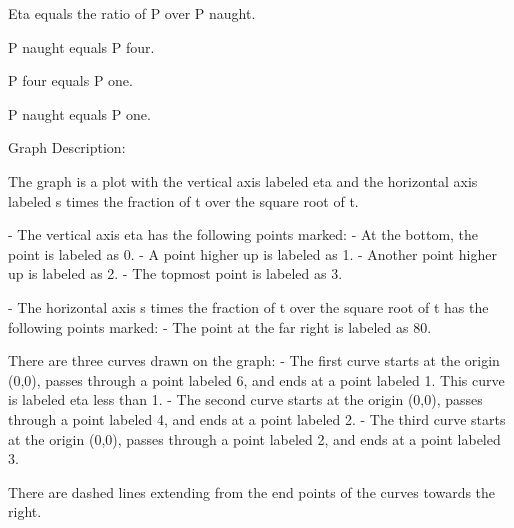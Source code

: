 Eta equals the ratio of P over P naught.

P naught equals P four.

P four equals P one.

P naught equals P one.

Graph Description:

The graph is a plot with the vertical axis labeled eta and the horizontal axis labeled s times the fraction of t over the square root of t.

- The vertical axis eta has the following points marked:
  - At the bottom, the point is labeled as 0.
  - A point higher up is labeled as 1.
  - Another point higher up is labeled as 2.
  - The topmost point is labeled as 3.

- The horizontal axis s times the fraction of t over the square root of t has the following points marked:
  - The point at the far right is labeled as 80.

There are three curves drawn on the graph:
- The first curve starts at the origin (0,0), passes through a point labeled 6, and ends at a point labeled 1. This curve is labeled eta less than 1.
- The second curve starts at the origin (0,0), passes through a point labeled 4, and ends at a point labeled 2.
- The third curve starts at the origin (0,0), passes through a point labeled 2, and ends at a point labeled 3.

There are dashed lines extending from the end points of the curves towards the right.